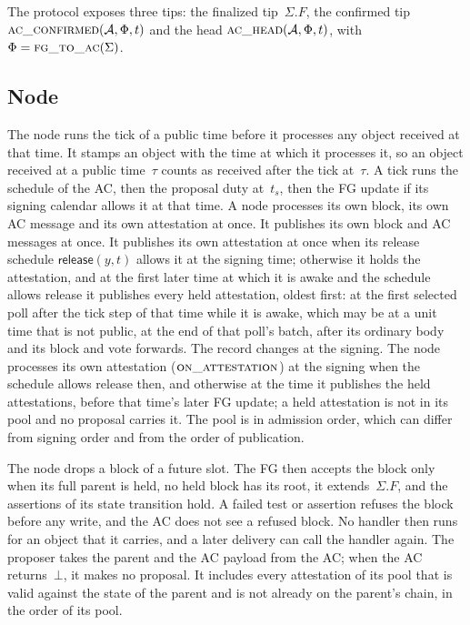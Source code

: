 The protocol exposes three tips: the finalized tip~$\Sigma.F$, the
confirmed tip $\Call{ac\_confirmed}{\AC,\Fr,t}$ and the head
$\Call{ac\_head}{\AC,\Fr,t}$, with $\Fr=\Call{fg\_to\_ac}{\Sigma}$.

\subsection{Node}\label{sec:node}

The node runs the tick of a public time before it processes any object
received at that time.  It stamps an object with the time at which it
processes it, so an object received at a public time~$\tau$ counts as
received after the tick at~$\tau$.  A tick runs the schedule of the AC,
then the proposal duty at~$t_s$,
then the FG update if its signing calendar allows it at that time.
A node processes its own block, its own AC
message and its own attestation at once.  It publishes its own block and AC
messages at once.  It publishes its own attestation at once when its release
schedule $\mathsf{release}(y,t)$ allows it at the signing time; otherwise it
holds the attestation, and at the first later time at which it is awake and
the schedule allows release it publishes every held attestation, oldest
first: at the first selected poll after the tick step of that time while it
is awake, which may be at a unit time that is not public, at the end of that
poll's batch, after its ordinary body and its block and vote forwards.  The
record changes at the signing.  The node processes its own attestation
($\Call{on\_attestation}{}$) at the signing when the schedule allows release
then, and otherwise at the time it publishes the held attestations, before
that time's later FG update; a held attestation is not in its pool and no
proposal carries it.  The pool is in admission order, which can differ from
signing order and from the order of publication.

The node drops a block of a future slot.  The FG then accepts the block
only when its full parent is held, no held block has its root, it
extends~$\Sigma.F$, and the assertions of its state transition hold.  A
failed test or assertion refuses the block before any write, and the AC
does not see a refused block.
No handler then runs for an object that it carries, and a later delivery
can call the handler again.  The proposer takes the parent and the AC
payload from the AC; when the AC returns~$\bot$, it makes no proposal.  It includes every attestation of its pool that is
valid against the state of the parent and is not already on the parent's
chain, in the order of its pool.

